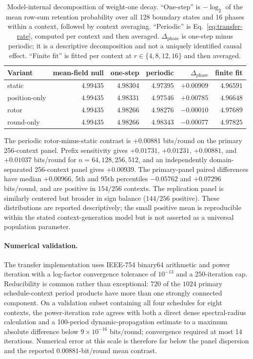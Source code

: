 \documentclass[cryptography,article,submit,oneauthor]{Definitions/mdpi}
\begin{document}
\begin{table}[t]
\caption{Model-internal decomposition of weight-one decay. ``One-step'' is $-\log_2$ of the mean row-sum retention probability over all 128 boundary states and 16 phases within a context, followed by context averaging. ``Periodic'' is Eq.~\eqref{eq:transfer-rate}, computed per context and then averaged. $\Delta_{\mathrm{phase}}$ is one-step minus periodic; it is a descriptive decomposition and not a uniquely identified causal effect. ``Finite fit'' is fitted per context at $r\in\{4,8,12,16\}$ and then averaged.}\label{tab:rate-decomposition}
\centering\scriptsize
\begin{tabular}{@{}lrrrrr@{}}
\toprule
Variant & mean-field null & one-step & periodic & $\Delta_{\mathrm{phase}}$ & finite fit \\
\midrule
static         & $4.99435$ & $4.98304$ & $4.97395$ & $+0.00909$ & $4.96591$ \\
position-only & $4.99435$ & $4.98331$ & $4.97546$ & $+0.00785$ & $4.96648$ \\
rotor          & $4.99435$ & $4.98266$ & $4.98276$ & $-0.00010$ & $4.97689$ \\
round-only    & $4.99435$ & $4.98266$ & $4.98343$ & $-0.00077$ & $4.97825$ \\
\bottomrule
\end{tabular}
\end{table}

The periodic rotor-minus-static contrast is $+0.00881$ bits/round on the primary 256-context panel. Prefix sensitivity gives $+0.01731$, $+0.01231$, $+0.00881$, and $+0.01037$ bits/round for $n=64,128,256,512$, and an independently domain-separated 256-context panel gives $+0.00939$. The primary-panel paired differences have median $+0.00966$, 5th and 95th percentiles $-0.05762$ and $+0.07296$ bits/round, and are positive in $154/256$ contexts. The replication panel is similarly centered but broader in sign balance ($144/256$ positive). These distributions are reported descriptively; the small positive mean is reproducible within the stated context-generation model but is not asserted as a universal population parameter.

\paragraph{Numerical validation.} The transfer implementation uses IEEE-754 binary64 arithmetic and power iteration with a log-factor convergence tolerance of $10^{-13}$ and a 250-iteration cap. Reducibility is common rather than exceptional: $720$ of the $1024$ primary schedule-context period products have more than one strongly connected component. On a validation subset containing all four schedules for eight contexts, the power-iteration rate agrees with both a direct dense spectral-radius calculation and a 100-period dynamic-propagation estimate to a maximum absolute difference below $9\times10^{-16}$ bits/round; convergence required at most 14 iterations. Numerical error at this scale is therefore far below the panel dispersion and the reported $0.00881$-bit/round mean contrast.
\end{document}
